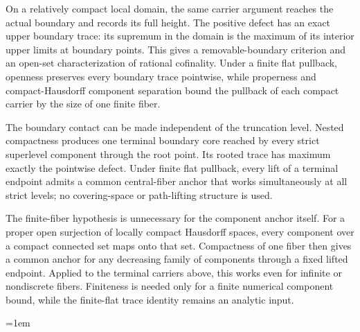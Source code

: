 \medskip



On a relatively compact local domain, the same carrier argument reaches the
actual boundary and records its full height.  The positive defect has an
exact upper boundary trace: its supremum in the domain is the maximum of its
interior upper limits at boundary points.  This gives a removable-boundary
criterion and an open-set characterization of rational cofinality.  Under a
finite flat pullback, openness preserves every boundary trace pointwise, while
properness and compact-Hausdorff component separation bound the pullback of
each compact carrier by the size of one finite fiber.

\medskip



The boundary contact can be made independent of the truncation level.
Nested compactness produces one terminal boundary core reached by every
strict superlevel component through the root point.  Its rooted trace has
maximum exactly the pointwise defect.  Under finite flat pullback, every
lift of a terminal endpoint admits a common central-fiber anchor that works
simultaneously at all strict levels; no covering-space or path-lifting
structure is used.

\medskip



The finite-fiber hypothesis is unnecessary for the component anchor itself.
For a proper open surjection of locally compact Hausdorff spaces, every
component over a compact connected set maps onto that set.  Compactness of
one fiber then gives a common anchor for any decreasing family of components
through a fixed lifted endpoint.  Applied to the terminal carriers above,
this works even for infinite or nondiscrete fibers.  Finiteness is needed
only for a finite numerical component bound, while the finite-flat trace
identity remains an analytic input.

\medskip

\begingroup
\emergencystretch=1em

\par\endgroup

